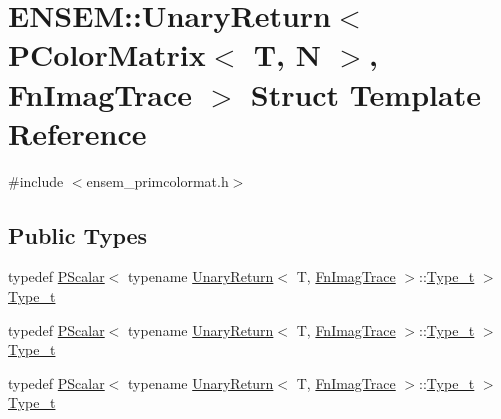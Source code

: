 \hypertarget{structENSEM_1_1UnaryReturn_3_01PColorMatrix_3_01T_00_01N_01_4_00_01FnImagTrace_01_4}{}\section{E\+N\+S\+EM\+:\+:Unary\+Return$<$ P\+Color\+Matrix$<$ T, N $>$, Fn\+Imag\+Trace $>$ Struct Template Reference}
\label{structENSEM_1_1UnaryReturn_3_01PColorMatrix_3_01T_00_01N_01_4_00_01FnImagTrace_01_4}


{\ttfamily \#include $<$ensem\+\_\+primcolormat.\+h$>$}

\subsection*{Public Types}
\begin{DoxyCompactItemize}
\item 
typedef \mbox{\hyperlink{classENSEM_1_1PScalar}{P\+Scalar}}$<$ typename \mbox{\hyperlink{structENSEM_1_1UnaryReturn}{Unary\+Return}}$<$ T, \mbox{\hyperlink{structENSEM_1_1FnImagTrace}{Fn\+Imag\+Trace}} $>$\+::\mbox{\hyperlink{structENSEM_1_1UnaryReturn_3_01PColorMatrix_3_01T_00_01N_01_4_00_01FnImagTrace_01_4_a8af03bca3da42c1840803fcbcdf3ad74}{Type\+\_\+t}} $>$ \mbox{\hyperlink{structENSEM_1_1UnaryReturn_3_01PColorMatrix_3_01T_00_01N_01_4_00_01FnImagTrace_01_4_a8af03bca3da42c1840803fcbcdf3ad74}{Type\+\_\+t}}
\item 
typedef \mbox{\hyperlink{classENSEM_1_1PScalar}{P\+Scalar}}$<$ typename \mbox{\hyperlink{structENSEM_1_1UnaryReturn}{Unary\+Return}}$<$ T, \mbox{\hyperlink{structENSEM_1_1FnImagTrace}{Fn\+Imag\+Trace}} $>$\+::\mbox{\hyperlink{structENSEM_1_1UnaryReturn_3_01PColorMatrix_3_01T_00_01N_01_4_00_01FnImagTrace_01_4_a8af03bca3da42c1840803fcbcdf3ad74}{Type\+\_\+t}} $>$ \mbox{\hyperlink{structENSEM_1_1UnaryReturn_3_01PColorMatrix_3_01T_00_01N_01_4_00_01FnImagTrace_01_4_a8af03bca3da42c1840803fcbcdf3ad74}{Type\+\_\+t}}
\item 
typedef \mbox{\hyperlink{classENSEM_1_1PScalar}{P\+Scalar}}$<$ typename \mbox{\hyperlink{structENSEM_1_1UnaryReturn}{Unary\+Return}}$<$ T, \mbox{\hyperlink{structENSEM_1_1FnImagTrace}{Fn\+Imag\+Trace}} $>$\+::\mbox{\hyperlink{structENSEM_1_1UnaryReturn_3_01PColorMatrix_3_01T_00_01N_01_4_00_01FnImagTrace_01_4_a8af03bca3da42c1840803fcbcdf3ad74}{Type\+\_\+t}} $>$ \mbox{\hyperlink{structENSEM_1_1UnaryReturn_3_01PColorMatrix_3_01T_00_01N_01_4_00_01FnImagTrace_01_4_a8af03bca3da42c1840803fcbcdf3ad74}{Type\+\_\+t}}
\end{DoxyCompactItemize}



